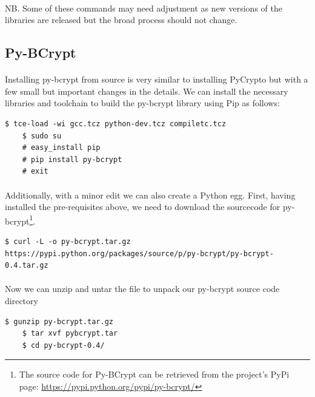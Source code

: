 \documentclass[12pt, a4paper, twoside]{book}
\begin{document}
\paragraph{} NB. Some of these commands may need adjustment as new versions of the libraries are released but the broad process should not change.


\subsection{Py-BCrypt}
\label{pybcrypt_egg}

\paragraph{} Installing py-bcrypt from source is very similar to installing PyCrypto but with a few small but important changes in the details. We can install the necessary libraries and toolchain to build the py-bcrypt library using Pip as follows:

\begin{lstlisting}[style=DOS]
    $ tce-load -wi gcc.tcz python-dev.tcz compiletc.tcz
    $ sudo su
    # easy_install pip
    # pip install py-bcrypt
    # exit 
\end{lstlisting}

\paragraph{} Additionally, with a minor edit we can also create a Python egg. First, having installed the pre-requisites above, we need to download the sourcecode for py-bcrypt\footnote{The source code for Py-BCrypt can be retrieved from the project's PyPi page: \url{https://pypi.python.org/pypi/py-bcrypt/}}.

\begin{lstlisting}[style=DOS]
    $ curl -L -o py-bcrypt.tar.gz https://pypi.python.org/packages/source/p/py-bcrypt/py-bcrypt-0.4.tar.gz
\end{lstlisting}

\paragraph{} Now we can unzip and untar the file to unpack our py-bcrypt source code directory

\begin{lstlisting}[style=DOS]
    $ gunzip py-bcrypt.tar.gz 
    $ tar xvf pybcrypt.tar
    $ cd py-bcrypt-0.4/
\end{lstlisting}
\end{document}

